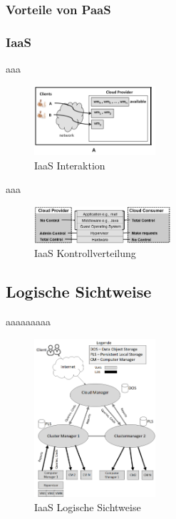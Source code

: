 \subsubsection*{Vorteile von PaaS}

\subsubsection{IaaS}
aaa
\begin{figure}[H]
    \centering
	\includegraphics[width=0.4\textwidth]{Images/IaaSInteraction}
	\caption{IaaS Interaktion \cite{Badger}}
	\label{IaaSInteraction}
\end{figure}

aaa
\begin{figure}[H]
    \centering
	\includegraphics[width=0.45\textwidth]{Images/IaaSControl}
	\caption{IaaS Kontrollverteilung \cite{Badger}}
	\label{IaaSControl}
\end{figure}

\subsection{Logische Sichtweise}
aaaaaaaaa
\begin{figure}[H]
    \centering
	\includegraphics[width=0.4\textwidth]{Images/IaaSLogic}
	\caption{IaaS Logische Sichtweise \cite{Badger}}
	\label{IaaSLogic}
\end{figure}

